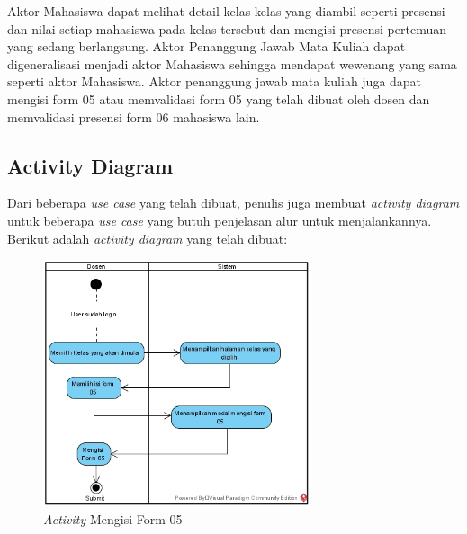 Aktor Mahasiswa dapat melihat detail kelas-kelas yang diambil seperti presensi dan nilai setiap mahasiswa pada kelas tersebut dan mengisi presensi pertemuan yang sedang berlangsung.
Aktor Penanggung Jawab Mata Kuliah dapat digeneralisasi menjadi aktor Mahasiswa sehingga mendapat wewenang yang sama seperti aktor Mahasiswa. Aktor penanggung jawab mata kuliah juga dapat mengisi form 05 atau memvalidasi form 05 yang telah dibuat oleh dosen dan memvalidasi presensi form 06 mahasiswa lain.

\subsection{Activity Diagram}

Dari beberapa \textit{use case} yang telah dibuat, penulis juga membuat \textit{activity diagram} untuk beberapa \textit{use case} yang butuh penjelasan alur untuk menjalankannya. Berikut adalah \textit{activity diagram} yang telah dibuat:

\begin{figure}[h!]
	\centering
	\includegraphics[width=0.7\textwidth]{gambar/diagram/Mengisi Form 05}
	\caption{\textit{Activity} Mengisi Form 05}
	\label{fig:activity2}
\end{figure}

